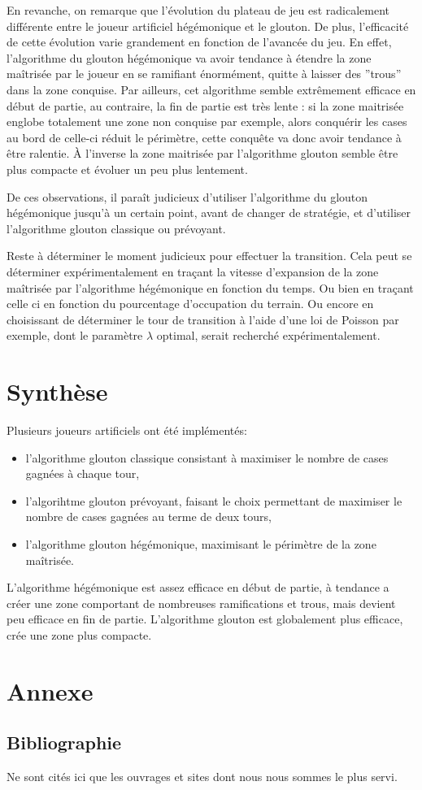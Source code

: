 \documentclass[12pt,a4paper,twoside]{article}
\begin{document}
En revanche, on remarque que l'évolution du plateau de jeu est
radicalement différente entre le joueur artificiel hégémonique et le
glouton. De plus, l'efficacité de cette évolution varie grandement en
fonction de l'avancée du jeu.  En effet, l'algorithme du glouton
hégémonique va avoir tendance à étendre la zone maîtrisée par le
joueur en se ramifiant énormément, quitte à laisser des ''trous'' dans
la zone conquise. Par ailleurs, cet algorithme semble extrêmement
efficace en début de partie, au contraire, la fin de partie est très
lente : si la zone maitrisée englobe totalement une zone non conquise
par exemple, alors conquérir les cases au bord de celle-ci réduit le
périmètre, cette conquête va donc avoir tendance à être ralentie.  À
l'inverse la zone maitrisée par l'algorithme glouton semble être plus
compacte et évoluer un peu plus lentement.

De ces observations, il paraît judicieux d'utiliser l'algorithme du
glouton hégémonique jusqu'à un certain point, avant de changer de
stratégie, et d'utiliser l'algorithme glouton classique ou prévoyant.

Reste à déterminer le moment judicieux pour effectuer la
transition. Cela peut se déterminer expérimentalement en traçant la
vitesse d'expansion de la zone maîtrisée par l'algorithme hégémonique
en fonction du temps. Ou bien en traçant celle ci en fonction du
pourcentage d'occupation du terrain. Ou encore en choisissant de
déterminer le tour de transition à l'aide d'une loi de Poisson par
exemple, dont le paramètre \(\lambda\) optimal, serait recherché
expérimentalement.
 
\section{Synthèse}
\label{sec:orgheadline26}
\label{sec:conclusion}
Plusieurs joueurs artificiels ont été implémentés: 
\begin{itemize}
\item l'algorithme glouton classique consistant à maximiser le nombre
  de cases gagnées à chaque tour,
\item l'algorihtme glouton prévoyant, faisant le choix permettant de
  maximiser le nombre de cases gagnées au terme de deux tours,
\item l'algorithme glouton hégémonique, maximisant le périmètre de la
  zone maîtrisée.
\end{itemize}
L'algorithme hégémonique est assez efficace en début de partie, à
tendance a créer une zone comportant de nombreuses ramifications et
trous, mais devient peu efficace en fin de partie. L'algorithme
glouton est globalement plus efficace, crée une zone plus compacte.

\clearpage\appendix

\section{Annexe}
\label{sec:orgheadline28}
\subsection{Bibliographie}
\label{sec:orgheadline27}
Ne sont cités ici que les ouvrages et sites dont nous nous sommes le plus
servi.

\def\section*#1{}

\nocite{*}

\clearpage
\end{document}
